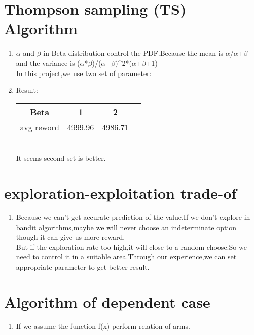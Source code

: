 \documentclass[paper=a4, fontsize=11pt]{scrartcl}
\numberwithin{equation}{section}		%
\numberwithin{figure}{section}			%
\numberwithin{table}{section}				%
\begin{document}
	\section{Thompson sampling (TS) Algorithm}
	\begin{enumerate}
    	\item $\alpha$ and $\beta$ in Beta distribution control the PDF.Because the mean is $\alpha$/$\alpha$+$\beta$ and the variance is ($\alpha$*$\beta$)/($\alpha$+$\beta$)^{2}*($\alpha$+$\beta$+1)\\
    	In this project,we use two set of parameter: 
    	
    	\item Result:\\
    	\begin{tabular}{c|ccc}
    	\hline
    	 Beta & 1 & 2 \\ \hline
    	avg reword  & 4999.96 & 4986.71 \\ \hline
        \end{tabular}\\
	    It seems second set is better.
    \end{enumerate}
    
    \section{exploration-exploitation trade-of}
	\begin{enumerate}
    	\item Because we can't get accurate prediction of the value.If we don't explore in bandit algorithms,maybe we will never choose an indeterminate option though it can give us more reward.\\
    	But if the exploration rate too high,it will close to a random choose.So we need to control it in a suitable area.Through our experience,we can set appropriate parameter to get better result.
    \end{enumerate}
    
    \section{Algorithm of dependent case}
	\begin{enumerate}
    	\item If we assume the function f(x) perform relation of arms.
    \end{enumerate}
    
\end{document}
